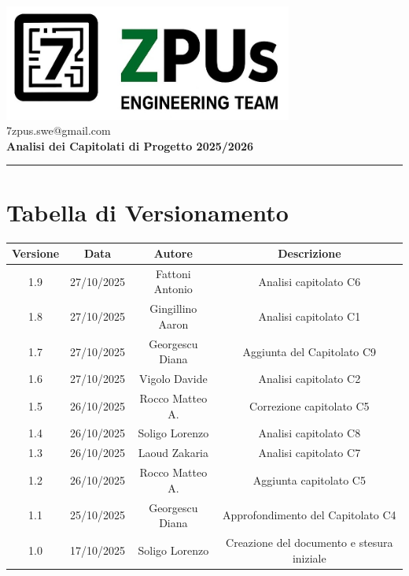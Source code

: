 \documentclass[a4paper,12pt]{article}
\begin{document}
\begin{center}
    \includegraphics[width=9.5cm]{../assets/logo7ZPUs.jpg}\\
    \small\hspace{10cm} 7zpus.swe@gmail.com\\
    \vspace{0.5cm}
    \Large \textbf{Analisi dei Capitolati di Progetto 2025/2026}\\
\end{center}

\vspace{0.3cm}
\hrule
\vspace{0.5cm}

\tableofcontents

\newpage

\section*{Tabella di Versionamento}
\begin{tabular}{|c|c|c|c|}
    \hline
    \textbf{Versione} & \textbf{Data} & \textbf{Autore}  & \textbf{Descrizione}            \\
    \hline
    1.9               & 27/10/2025    & Fattoni Antonio  & Analisi capitolato C6                      \\
    \hline
    1.8               & 27/10/2025    & Gingillino Aaron & Analisi capitolato C1                      \\
    \hline
    1.7               & 27/10/2025    & Georgescu Diana  & Aggiunta del Capitolato C9                 \\
    \hline
    1.6               & 27/10/2025    & Vigolo Davide    & Analisi capitolato C2                      \\
    \hline
    1.5               & 26/10/2025    & Rocco Matteo A.  & Correzione capitolato C5                   \\
    \hline
    1.4               & 26/10/2025    & Soligo Lorenzo   & Analisi capitolato C8                      \\
    \hline
    1.3               & 26/10/2025    & Laoud Zakaria    & Analisi capitolato C7                      \\
    \hline
    1.2               & 26/10/2025    & Rocco Matteo A.  & Aggiunta capitolato C5                     \\
    \hline
    1.1               & 25/10/2025    & Georgescu Diana  & Approfondimento del Capitolato C4          \\
    \hline
    1.0               & 17/10/2025    & Soligo Lorenzo   & Creazione del documento e stesura iniziale \\
    \hline

\end{tabular}
\end{document}
